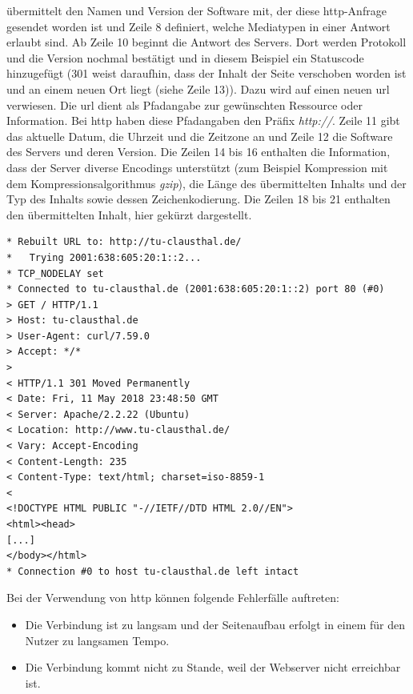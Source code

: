 \documentclass[titlepage]{report}
\begin{document}
übermittelt den Namen und Version der Software mit, der diese
\gls{http}\hyp{}Anfrage gesendet worden ist und Zeile 8 definiert,
welche Mediatypen in einer Antwort erlaubt sind\cite{RFC2616}. Ab Zeile
10 beginnt die Antwort des Servers. Dort werden Protokoll und die
Version nochmal bestätigt und in diesem Beispiel ein Statuscode
hinzugefügt (301 weist daraufhin, dass der Inhalt der Seite verschoben
worden ist und an einem neuen Ort liegt (siehe Zeile 13)). Dazu wird auf
einen neuen \gls{url} verwiesen. Die \gls{url} dient als Pfadangabe zur
gewünschten Ressource oder Information. Bei \gls{http} haben diese
Pfadangaben den Präfix \emph{http://}. Zeile 11 gibt
das aktuelle Datum, die Uhrzeit und die Zeitzone an und Zeile 12 die
Software des Servers und deren Version. Die Zeilen 14 bis 16
enthalten die Information, dass der Server diverse Encodings unterstützt
(zum Beispiel Kompression mit dem Kompressionsalgorithmus \emph{gzip}),
die Länge des übermittelten Inhalts und der Typ des Inhalts sowie dessen
Zeichenkodierung. Die Zeilen 18 bis 21 enthalten den übermittelten
Inhalt, hier gekürzt dargestellt.
\begin{minipage}{\linewidth}
\begin{lstlisting}[caption={Eine HTTP-Anfrage an
http://tu-clausthal.de},label={lst:httpanfrage}]
* Rebuilt URL to: http://tu-clausthal.de/
*   Trying 2001:638:605:20:1::2...
* TCP_NODELAY set
* Connected to tu-clausthal.de (2001:638:605:20:1::2) port 80 (#0)
> GET / HTTP/1.1
> Host: tu-clausthal.de
> User-Agent: curl/7.59.0
> Accept: */*
>
< HTTP/1.1 301 Moved Permanently
< Date: Fri, 11 May 2018 23:48:50 GMT
< Server: Apache/2.2.22 (Ubuntu)
< Location: http://www.tu-clausthal.de/
< Vary: Accept-Encoding
< Content-Length: 235
< Content-Type: text/html; charset=iso-8859-1
<
<!DOCTYPE HTML PUBLIC "-//IETF//DTD HTML 2.0//EN">
<html><head>
[...]
</body></html>
* Connection #0 to host tu-clausthal.de left intact
\end{lstlisting}
\end{minipage}
Bei der Verwendung von \gls{http} können folgende Fehlerfälle auftreten:
\begin{itemize}
    \item Die Verbindung ist zu langsam und der Seitenaufbau erfolgt in
          einem für den Nutzer zu langsamen Tempo.
    \item Die Verbindung kommt nicht zu Stande, weil der Webserver nicht
          erreichbar ist.
\end{itemize}
\end{document}
